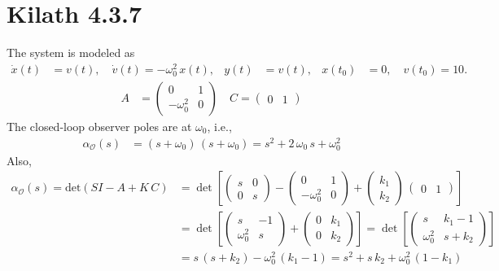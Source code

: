 \section{Kilath 4.3.7}
The system is modeled as 
\begin{align*}
    \dot x(t) &= v(t), \quad \dot v(t) = -\omega_0^2\,x(t), & y(t)&= v(t), & x(t_0) &= 0, \quad v(t_0) = 10.
\end{align*}
\begin{align*}
    A &= \begin{pmatrix}
        0 & 1 \\ -\omega_0^2 & 0
    \end{pmatrix} \quad C = \begin{pmatrix}
        0 & 1
    \end{pmatrix}
\end{align*}
The closed-loop observer poles are at $\omega_0$, i.e., 
\begin{align*}
    \alpha_\mathcal{O}(s) &= \left(s + \omega_0\right)\,\left(s + \omega_0\right) = s^2 + 2\,\omega_0\,s + \omega_0^2
\end{align*}
Also, 
\begin{align*}
    \alpha_\mathcal{O}(s) = \text{det}\left(SI - A + K\,C\right) &= \det\left[\begin{pmatrix}
        s & 0 \\ 0 & s
    \end{pmatrix} - \begin{pmatrix}
        0 & 1 \\ -\omega_0^2 & 0
    \end{pmatrix} + \begin{pmatrix}
        k_1 \\ k_2
    \end{pmatrix}\,\begin{pmatrix}
        0 & 1
    \end{pmatrix}\right] \\
    &= \det\left[\begin{pmatrix}
        s & -1 \\ \omega_0^2 & s
    \end{pmatrix} + \begin{pmatrix}
        0 & k_1 \\ 0 & k_2
    \end{pmatrix}\right] = \det\left[\begin{pmatrix}
        s & k_1-1 \\ \omega_0^2 & s + k_2
    \end{pmatrix}\right] \\
    &= s\,\left(s + k_2\right) - \omega_0^2\,\left(k_1 - 1\right) = s^2 + s\,k_2 + \omega_0^2\,\left(1 - k_1\right)
\end{align*}
